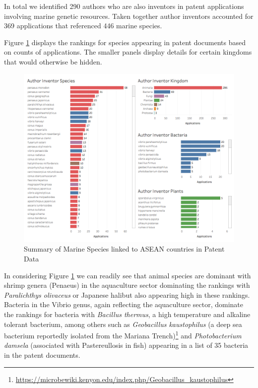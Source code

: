 \documentclass[]{book}
\theoremstyle{definition}
\theoremstyle{definition}
\theoremstyle{definition}
\theoremstyle{remark}
\begin{document}
In total we identified 290 authors who are also inventors in patent
applications involving marine genetic resources. Taken together author
inventors accounted for 369 applications that referenced 446 marine
species.

Figure \ref{fig:authorinventorspecies} displays the rankings for species
appearing in patent documents based on counts of applications. The
smaller panels display details for certain kingdoms that would otherwise
be hidden.

\begin{figure}

{\centering \includegraphics[width=1\linewidth]{images-patents/author_inventor_species_dashboard} 

}

\caption{Summary of Marine Species linked to ASEAN countries in Patent Data}\label{fig:authorinventorspecies}
\end{figure}

In considering Figure \ref{fig:authorinventorspecies} we can readily see
that animal species are dominant with shrimp genera (Penaeus) in the
aquaculture sector dominating the rankings with \emph{Paralichthys
olivaceus} or Japanese halibut also appearing high in these rankings.
Bacteria in the Vibrio genus, again reflecting the aquaculture sector,
dominate the rankings for bacteria with \emph{Bacillus thermus}, a high
temperature and alkaline tolerant bacterium, among others such as
\emph{Geobacillus kaustophilus} (a deep sea bacterium reportedly
isolated from the Mariana Trench)\footnote{\url{https://microbewiki.kenyon.edu/index.php/Geobacillus_kaustophilus}}
and \emph{Photobacterium damsela} (associated with Pastereullosis in
fish) appearing in a list of 35 bacteria in the patent documents.
\end{document}
